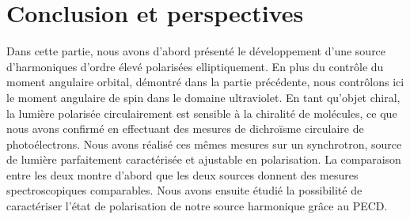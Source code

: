 \section*{Conclusion et perspectives}
Dans cette partie, nous avons d'abord présenté le développement d'une source d'harmoniques d'ordre élevé polarisées elliptiquement. En plus du contrôle du moment angulaire orbital, démontré dans la partie précédente, nous contrôlons ici le moment angulaire de spin dans le domaine ultraviolet. En tant qu'objet chiral, la lumière polarisée circulairement est sensible à la chiralité de molécules, ce que nous avons confirmé en effectuant des mesures de dichroïsme circulaire de photoélectrons. Nous avons réalisé ces mêmes mesures sur un synchrotron, source de lumière parfaitement caractérisée et ajustable en polarisation. La comparaison entre les deux montre d'abord que les deux sources donnent des mesures spectroscopiques comparables. Nous avons ensuite étudié la possibilité de caractériser l'état de polarisation de notre source harmonique grâce au PECD.
